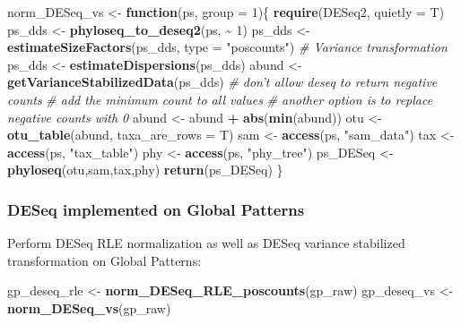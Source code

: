 \documentclass[
]{book}
\newenvironment{Shaded}{\begin{snugshade}}{\end{snugshade}}
\newcommand{\CommentTok}[1]{\textcolor[rgb]{0.56,0.35,0.01}{\textit{#1}}}
\newcommand{\ControlFlowTok}[1]{\textcolor[rgb]{0.13,0.29,0.53}{\textbf{#1}}}
\newcommand{\DataTypeTok}[1]{\textcolor[rgb]{0.13,0.29,0.53}{#1}}
\newcommand{\DecValTok}[1]{\textcolor[rgb]{0.00,0.00,0.81}{#1}}
\newcommand{\KeywordTok}[1]{\textcolor[rgb]{0.13,0.29,0.53}{\textbf{#1}}}
\newcommand{\NormalTok}[1]{#1}
\newcommand{\OperatorTok}[1]{\textcolor[rgb]{0.81,0.36,0.00}{\textbf{#1}}}
\newcommand{\StringTok}[1]{\textcolor[rgb]{0.31,0.60,0.02}{#1}}
\begin{document}
\begin{Shaded}
\begin{Highlighting}[]
\NormalTok{norm\_DESeq\_vs \textless{}{-}}\StringTok{ }\ControlFlowTok{function}\NormalTok{(ps, }\DataTypeTok{group =} \DecValTok{1}\NormalTok{)\{}
  \KeywordTok{require}\NormalTok{(DESeq2, }\DataTypeTok{quietly =}\NormalTok{ T)}
\NormalTok{  ps\_dds \textless{}{-}}\StringTok{ }\KeywordTok{phyloseq\_to\_deseq2}\NormalTok{(ps, }\OperatorTok{\textasciitilde{}}\StringTok{ }\DecValTok{1}\NormalTok{)}
\NormalTok{  ps\_dds \textless{}{-}}\StringTok{ }\KeywordTok{estimateSizeFactors}\NormalTok{(ps\_dds, }\DataTypeTok{type =} \StringTok{"poscounts"}\NormalTok{)}
  \CommentTok{\# Variance transformation}
\NormalTok{  ps\_dds \textless{}{-}}\StringTok{ }\KeywordTok{estimateDispersions}\NormalTok{(ps\_dds)}
\NormalTok{  abund \textless{}{-}}\StringTok{ }\KeywordTok{getVarianceStabilizedData}\NormalTok{(ps\_dds)}
  \CommentTok{\# don’t allow deseq to return negative counts}
  \CommentTok{\# add the minimum count to all values}
  \CommentTok{\# another option is to replace negative counts with 0}
\NormalTok{  abund \textless{}{-}}\StringTok{ }\NormalTok{abund }\OperatorTok{+}\StringTok{ }\KeywordTok{abs}\NormalTok{(}\KeywordTok{min}\NormalTok{(abund)) }
\NormalTok{  otu \textless{}{-}}\StringTok{ }\KeywordTok{otu\_table}\NormalTok{(abund, }\DataTypeTok{taxa\_are\_rows =}\NormalTok{ T)}
\NormalTok{  sam \textless{}{-}}\StringTok{ }\KeywordTok{access}\NormalTok{(ps, }\StringTok{"sam\_data"}\NormalTok{)}
\NormalTok{  tax \textless{}{-}}\StringTok{ }\KeywordTok{access}\NormalTok{(ps, }\StringTok{"tax\_table"}\NormalTok{)}
\NormalTok{  phy \textless{}{-}}\StringTok{ }\KeywordTok{access}\NormalTok{(ps, }\StringTok{"phy\_tree"}\NormalTok{)}
\NormalTok{  ps\_DESeq \textless{}{-}}\StringTok{ }\KeywordTok{phyloseq}\NormalTok{(otu,sam,tax,phy)}
  \KeywordTok{return}\NormalTok{(ps\_DESeq)}
\NormalTok{\}}
\end{Highlighting}
\end{Shaded}

\hypertarget{deseq-implemented-on-global-patterns}{%
\subsubsection{DESeq implemented on Global Patterns}\label{deseq-implemented-on-global-patterns}}

Perform DESeq RLE normalization as well as DESeq variance stabilized transformation on Global Patterns:

\begin{Shaded}
\begin{Highlighting}[]
\NormalTok{gp\_deseq\_rle \textless{}{-}}\StringTok{ }\KeywordTok{norm\_DESeq\_RLE\_poscounts}\NormalTok{(gp\_raw)}
\NormalTok{gp\_deseq\_vs \textless{}{-}}\StringTok{ }\KeywordTok{norm\_DESeq\_vs}\NormalTok{(gp\_raw)}
\end{Highlighting}
\end{Shaded}
\end{document}
